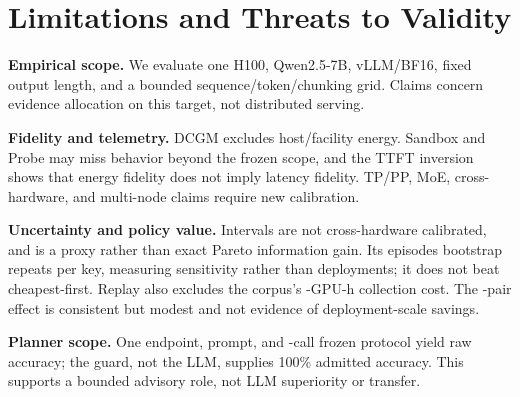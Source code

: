 \section{Limitations and Threats to Validity}

\textbf{Empirical scope.}  We evaluate one H100, Qwen2.5-7B, vLLM/BF16, fixed
output length, and a bounded sequence/token/chunking grid.  Claims concern
evidence allocation on this target, not distributed serving.

\textbf{Fidelity and telemetry.}  DCGM excludes host/facility energy.  Sandbox
and Probe may miss behavior beyond the frozen scope, and the TTFT inversion
shows that energy fidelity does not imply latency fidelity.  TP/PP, MoE,
cross-hardware, and multi-node claims require new calibration.

\textbf{Uncertainty and policy value.}  Intervals are not cross-hardware
calibrated, and \ipig{} is a proxy rather than exact Pareto information gain.
Its \PolicyEpisodes{} episodes bootstrap \PolicyHardwareRepeats{} repeats per
key, measuring sensitivity rather than deployments; it does not beat
cheapest-first.  Replay also excludes the corpus's
\ConfigurationTotalGPUHours{}-GPU-h collection cost.  The
\WinnerConfirmationPairs{}-pair \WinnerEnergySaving{} effect is consistent but
modest and not evidence of deployment-scale savings.

\textbf{Planner scope.}  One endpoint, prompt, and
\PlannerCallsPerSet{}-call frozen protocol yield \PlannerVtwoRaw{} raw accuracy;
the guard, not the LLM, supplies 100\% admitted accuracy.  This supports a
bounded advisory role, not LLM superiority or transfer.

